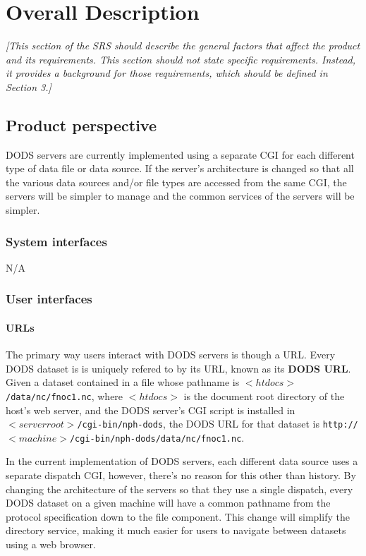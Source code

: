 \documentclass{article}
\newcommand{\na}{{\sc N/A}\xspace}
\begin{document}

\section{Overall Description}
\label{sec:overall}

\emph{[This section of the SRS should describe the general factors that
  affect the product and its requirements. This section should not state
  specific requirements. Instead, it provides a background for those
  requirements, which should be defined in Section 3.]}

\subsection{Product perspective}
DODS servers are currently implemented using a separate CGI for each
different type of data file or data source. If the server's
architecture is changed so that all the various data sources and/or
file types are accessed from the same CGI, the servers will be simpler
to manage and the common services of the servers will be simpler. 

\subsubsection{System interfaces}
\na
\subsubsection{User interfaces}
\paragraph{URLs}
The primary way users interact with DODS servers is though a
URL. Every DODS dataset is is uniquely refered to by its URL, known as
its \textbf{DODS URL}. Given a dataset contained
in a file whose pathname is \texttt{$<htdocs>$/data/nc/fnoc1.nc},
where \texttt{$<htdocs>$} is the document root directory of the host's
web server, and the DODS server's CGI script is installed in
\texttt{$<server root>$/cgi-bin/nph-dods}, the DODS URL for that
dataset is \texttt{http://$<machine>$/cgi-bin/nph-dods/data/nc/fnoc1.nc}.

In the current implementation of DODS servers, each different data
source uses a separate dispatch CGI, however, there's no reason for
this other than history. By changing the architecture of the servers
so that they use a single dispatch, every DODS dataset on a given
machine will have a common pathname from the protocol specification
down to the file component. This change will simplify the directory
service, making it much easier for users to navigate between datasets
using a web browser.
\end{document}
